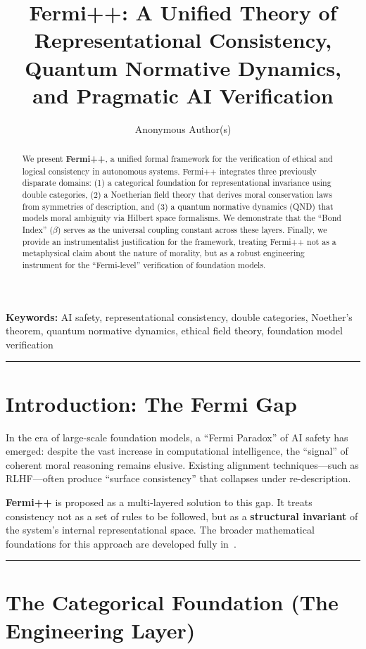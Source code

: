 \documentclass[12pt]{article}
\title{Fermi++: A Unified Theory of Representational Consistency, Quantum Normative Dynamics, and Pragmatic AI Verification}
\author{Anonymous Author(s)}
\date{}
\begin{document}
\maketitle

\noindent\textbf{Keywords:} AI safety, representational consistency, double categories, Noether's theorem, quantum normative dynamics, ethical field theory, foundation model verification

\begin{abstract}
We present \textbf{Fermi++}, a unified formal framework for the verification of ethical and logical consistency in autonomous systems. Fermi++ integrates three previously disparate domains: (1) a categorical foundation for representational invariance using double categories, (2) a Noetherian field theory that derives moral conservation laws from symmetries of description, and (3) a quantum normative dynamics (QND) that models moral ambiguity via Hilbert space formalisms. We demonstrate that the ``Bond Index'' ($\beta$) serves as the universal coupling constant across these layers. Finally, we provide an instrumentalist justification for the framework, treating Fermi++ not as a metaphysical claim about the nature of morality, but as a robust engineering instrument for the ``Fermi-level'' verification of foundation models.
\end{abstract}

\bigskip
\hrule
\bigskip

\section{Introduction: The Fermi Gap}

In the era of large-scale foundation models, a ``Fermi Paradox'' of AI safety has emerged: despite the vast increase in computational intelligence, the ``signal'' of coherent moral reasoning remains elusive. Existing alignment techniques---such as RLHF---often produce ``surface consistency'' that collapses under re-description.

\textbf{Fermi++} is proposed as a multi-layered solution to this gap. It treats consistency not as a set of rules to be followed, but as a \textbf{structural invariant} of the system's internal representational space. The broader mathematical foundations for this approach are developed fully in~\cite{bond2026ge}.

\bigskip
\hrule
\bigskip

\section{The Categorical Foundation (The Engineering Layer)}
\end{document}

